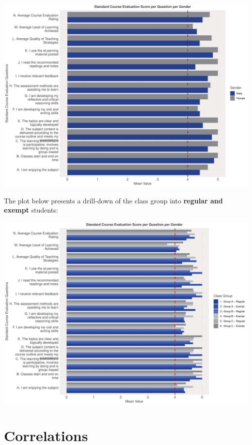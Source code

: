 \documentclass[
]{article}
\begin{document}
\includegraphics{AnalysisOfCourseEvaluation-Notebook_files/figure-latex/VisualizationsForCourseEvaluationResultsperGender-1.pdf}

\newpage

The plot below presents a drill-down of the class group into
\textbf{regular and exempt} students:

\includegraphics{AnalysisOfCourseEvaluation-Notebook_files/figure-latex/VisualizationsForCourseEvaluationResultsperGroup-1.pdf}

\newpage

\section{Correlations}\label{correlations}
\end{document}
